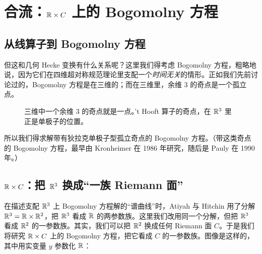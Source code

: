 \section{合流：$\mathbb{R}\times C$ 上的 Bogomolny 方程}

\par\medskip

\subsection{从线算子到 Bogomolny 方程}

但这和几何 Hecke 变换有什么关系呢？这里我们得考虑 Bogomolny 方程，粗略地说，因为它们在四维超对称规范理论里支配一个\emph{时间无关}的情形。正如我们先前讨论过的，Bogomolny 方程是在三维的；而在三维里，余维 $3$ 的奇点是一个孤立点。

\begin{figure}[htbp]
\centering
{}
\caption{三维中一个余维 $3$ 的奇点就是一点。't Hooft 算子的奇点，在 $\mathbb{R}^3$ 里正是单极子的位置。}
\label{fig:codim3}
\end{figure}

所以我们得求解带有狄拉克单极子型孤立奇点的 Bogomolny 方程。（带这类奇点的 Bogomolny 方程，最早由 Kronheimer 在 1986 年研究，随后是 Pauly 在 1990 年。）

\subsection{$\mathbb{R}\times C$：把 $\mathbb{R}^3$ 换成“一族 Riemann 面”}

在描述支配 $\mathbb{R}^3$ 上 Bogomolny 方程解的“谱曲线”时，Atiyah 与 Hitchin 用了分解 $\mathbb{R}^3=\mathbb{R}\times\mathbb{R}^2$，把 $\mathbb{R}^3$ 看成 $\mathbb{R}$ 的两参数族。这里我们改用同一个分解，但把 $\mathbb{R}^3$ 看成 $\mathbb{R}^2$ 的一参数族。其实，我们可以把 $\mathbb{R}^2$ 换成任何 Riemann 面 $C$。于是我们将研究 $\mathbb{R}\times C$ 上的 Bogomolny 方程，把它看成 $C$ 的一参数族。图像是这样的，其中用实变量 $y$ 参数化 $\mathbb{R}$：

